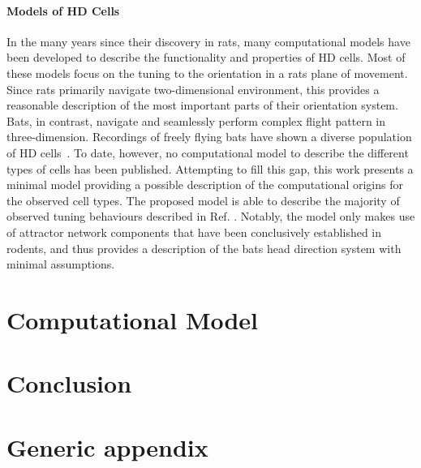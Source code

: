 \documentclass[a4paper,11pt,leqno]{article}
\newcommand{\bib}{literature.bib}
\begin{document}
\paragraph{Models of HD Cells} In the many years since their discovery in rats, many computational models have been developed to describe the functionality and properties of HD cells. Most of these models focus on the tuning to the orientation in a rats plane of movement. Since rats primarily navigate two-dimensional environment, this provides a reasonable description of the most important parts of their orientation system.
Bats, in contrast, navigate and seamlessly perform complex flight pattern in three-dimension. Recordings of freely flying bats have shown a diverse population of HD cells~\cite{Finkelstein2015}. To date, however, no computational model to describe the different types of cells has been published. Attempting to fill this gap, this work presents a minimal model providing a possible description of the computational origins for the observed cell types. The proposed model is able to describe the majority of observed tuning behaviours described in Ref. \cite{Finkelstein2015}. Notably, the model only makes use of attractor network components that have been conclusively established in rodents, and thus provides a description of the bats head direction system with minimal assumptions.


\section{Computational Model}\label{s:section}




\section{Conclusion}\label{s:ccl}



\appendix

\section{Generic appendix}\label{a:appendix1}
\end{document}
